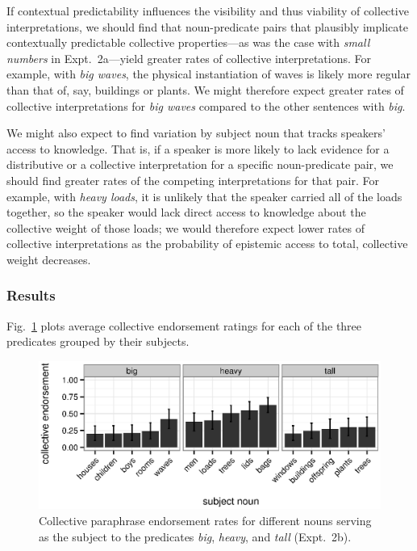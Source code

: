 \documentclass[linguex]{sp}
\begin{document}
If contextual predictability influences the visibility and thus viability of collective interpretations, we should find that noun-predicate pairs that plausibly implicate contextually predictable collective properties---as was the case with \emph{small numbers} in Expt.~2a---yield greater rates of collective interpretations. For example, with \emph{big waves}, the physical instantiation of waves is likely more regular than that of, say, buildings or plants. We might therefore expect greater rates of collective interpretations for \emph{big waves} compared to the other sentences with \emph{big}.

We might also expect to find variation by subject noun that tracks speakers' access to knowledge. That is, if a speaker is more likely to lack evidence for a distributive or a collective interpretation for a specific noun-predicate pair, we should find greater rates of the competing interpretations for that pair. For example, with \emph{heavy loads}, it is unlikely that the speaker carried all of the loads together, so the speaker would lack direct access to knowledge about the collective weight of those loads; we would therefore expect lower rates of collective interpretations as the probability of epistemic access to total, collective weight decreases.

\subsubsection{Results}

Fig.~\ref{bhtcoll} plots average collective endorsement ratings for each of the three predicates grouped by their subjects.

\begin{figure}[h!]
	\centering
	\includegraphics[width=.85\linewidth]{plots/bht_plot2.eps}
	\vspace{0pt}
	\caption{Collective paraphrase endorsement rates for different nouns serving as the subject to the predicates \emph{big}, \emph{heavy}, and \emph{tall} (Expt.~2b).} \label{bhtcoll}
\end{figure}
\end{document}
